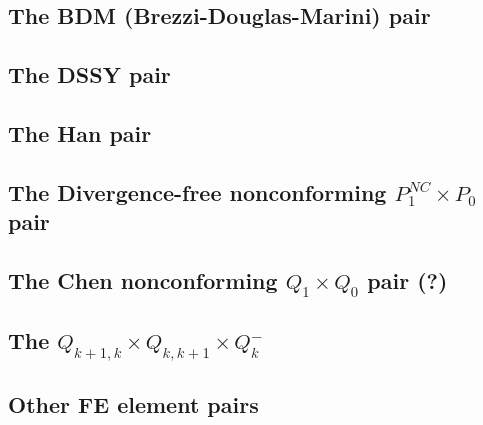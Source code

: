 \subsection{The BDM (Brezzi-Douglas-Marini) pair} \label{ss:bdm}


\subsection{The DSSY pair} \label{ss:pair_dssy2D}


\subsection{The Han pair} \label{ss:han}


\subsection{The Divergence-free nonconforming ${ P}_1^{NC}\times P_0$ pair} \label{ss:p1ncp0}


\subsection{The Chen nonconforming ${ Q}_1\times Q_0$ pair (?)} \label{ss:chenq0}


\subsection{The $Q_{k+1,k}\times Q_{k,k+1} \times Q_{k}^-$ \label{ss:qqq_elt}}


\subsection{Other FE element pairs}

